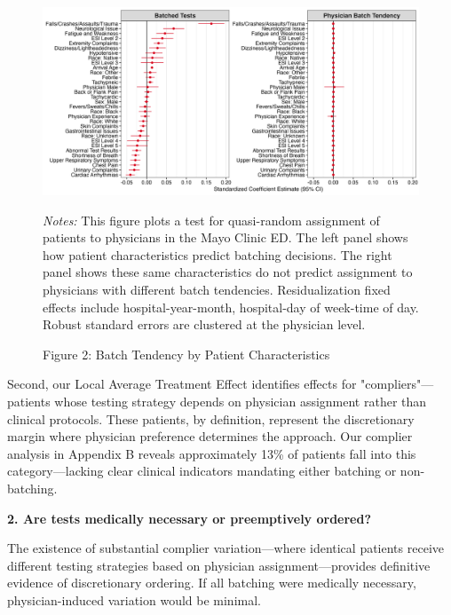 \documentclass[11pt]{article}
\newcommand{\1}{\hbox{\rm 1\kern-.35em 1}}
\begin{document}
\begin{figure}[h]
\centering
\caption*{Figure 2: Batch Tendency by Patient Characteristics}
\begin{threeparttable}
\includegraphics[width=\textwidth]{../outputs/figures/fig2_panel_batched_standardized.png}
    \begin{tablenotes}
        \small
        \item \textit{Notes:} This figure plots a test for quasi-random assignment of patients to physicians in the Mayo Clinic ED. The left panel shows how patient characteristics predict batching decisions. The right panel shows these same characteristics do not predict assignment to physicians with different batch tendencies. Residualization fixed effects include hospital-year-month, hospital-day of week-time of day. Robust standard errors are clustered at the physician level.
    \end{tablenotes}
\end{threeparttable}
\end{figure}

Second, our Local Average Treatment Effect identifies effects for "compliers"—patients whose testing strategy depends on physician assignment rather than clinical protocols. These patients, by definition, represent the discretionary margin where physician preference determines the approach. Our complier analysis in Appendix B reveals approximately 13\% of patients fall into this category—lacking clear clinical indicators mandating either batching or non-batching.

\textbf{2. Are tests medically necessary or preemptively ordered?}

The existence of substantial complier variation—where identical patients receive different testing strategies based on physician assignment—provides definitive evidence of discretionary ordering. If all batching were medically necessary, physician-induced variation would be minimal.
\end{document}
